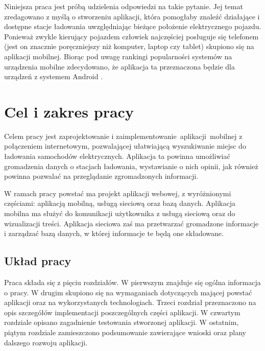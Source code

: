 Niniejsza praca jest próbą udzielenia odpowiedzi na takie pytanie. Jej temat zredagowano z myślą o stworzeniu aplikacji, która pomogłaby znaleźć działające i dostępne stacje ładowania uwzględniając bieżące położenie elektrycznego pojazdu. Ponieważ zwykle kierujący pojazdem człowiek najczęściej posługuje się telefonem (jest on znacznie poręczniejszy niż komputer, laptop czy tablet) skupiono się na aplikacji mobilnej. Biorąc pod uwagę rankingi popularności systemów na urządzenia mobilne zdecydowano, że aplikacja ta przeznaczona będzie dla urządzeń z systemem Android \cite{avi1}.


\section{Cel i zakres pracy}
Celem pracy jest zaprojektowanie i zaimplementowanie aplikacji mobilnej z połączeniem internetowym, pozwalającej ułatwiającą wyszukiwanie miejsc do ładowania samochodów elektrycznych. Aplikacja ta powinna umożliwiać gromadzenia danych o stacjach ładowania, wystawianie o nich opinii, jak również powinna pozwalać na przeglądanie zgromadzonych informacji. 

W ramach pracy powstać ma projekt aplikacji webowej, z wyróżnionymi częściami: aplikacją mobilną, usługą sieciową oraz bazą danych.
Aplikacja mobilna ma służyć do komunikacji użytkownika z usługą sieciową oraz do wizualizacji treści.
Aplikacja sieciowa zaś ma przetwarzać gromadzone informacje i zarządzać bazą danych, w której informacje te będą one składowane.


\subsection{Układ pracy}
Praca składa się z pięciu rozdziałów. W pierwszym znajduje się ogólna informacja o pracy.
W drugim skupiono się na wymaganiach dotyczących mającej powstać aplikacji oraz na wykorzystanych technologiach.
Trzeci rozdział przeznaczono na opis szczegółów implementacji poszczególnych części aplikacji.
W czwartym rozdziale opisano zagadnienie testowania stworzonej aplikacji.
W ostatnim, piątym rozdziale zamieszczono podsumowanie zawierające wnioski oraz plany dalszego rozwoju aplikacji.